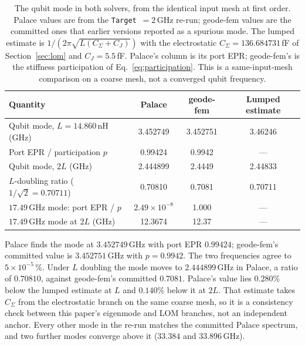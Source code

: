 \documentclass{anvil-paper}
\begin{document}
\begin{table}[t]
  \centering
  \caption{The qubit mode in both solvers, from the identical input mesh
  at first order. Palace values are from the \texttt{Target}~$= 2$\,GHz
  re-run; geode-fem values are the committed ones that earlier versions
  reported as a spurious mode. The lumped estimate is
  $1/(2\pi\sqrt{L(C_\Sigma + C_J)})$ with the electrostatic
  $C_\Sigma = 136.684731$\,fF of Section~\ref{sec:lom} and
  $C_J = 5.5$\,fF. Palace's column is its port EPR; geode-fem's is the
  stiffness participation of Eq.~\ref{eq:participation}. This is a
  same-input-mesh comparison on a coarse mesh, not a converged qubit
  frequency.}
  \label{tab:qubit}
  \small
  \begin{tabular}{@{}lccc@{}}
    \toprule
    Quantity & Palace & geode-fem & Lumped estimate \\
    \midrule
    Qubit mode, $L = 14.860$\,nH (GHz) & 3.452749 & 3.452751 & 3.46246 \\
    Port EPR / participation $p$ & 0.99424 & 0.9942 & --- \\
    Qubit mode, $2L$ (GHz) & 2.444899 & 2.4449 & 2.44833 \\
    $L$-doubling ratio ($1/\sqrt{2} = 0.70711$) & 0.70810 & 0.7081 & 0.70711 \\
    \midrule
    $17.49$\,GHz mode: port EPR / $p$ & $2.49\times10^{-8}$ & 1.000 & --- \\
    $17.49$\,GHz mode at $2L$ (GHz) & 12.3674 & 12.37 & --- \\
    \bottomrule
  \end{tabular}
\end{table}

Palace finds the mode at $3.452749$\,GHz with port EPR $0.99424$;
geode-fem's committed value is $3.452751$\,GHz with $p = 0.9942$. The two
frequencies agree to $5\times10^{-5}\,\%$. Under $L$ doubling the mode
moves to $2.444899$\,GHz in Palace, a ratio of $0.70810$, against
geode-fem's committed $0.7081$. Palace's value lies $0.280\%$ below the
lumped estimate at $L$ and $0.140\%$ below it at $2L$. That estimate
takes $C_\Sigma$ from the electrostatic branch on the same coarse mesh,
so it is a consistency check between this paper's eigenmode and LOM
branches, not an independent anchor. Every other mode in the re-run
matches the committed Palace spectrum, and two further modes converge
above it ($33.384$ and $33.896$\,GHz).
\end{document}
